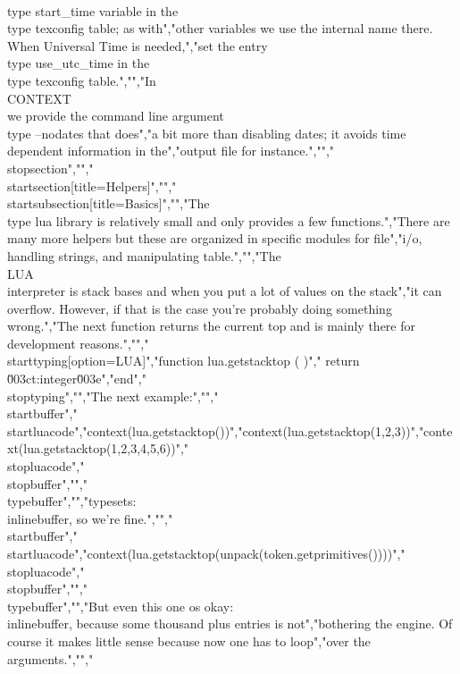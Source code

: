 \\type {start_time} variable in the \\type {texconfig} table; as with","other variables we use the internal name there. When Universal Time is needed,","set the entry \\type {use_utc_time} in the \\type {texconfig} table.","","In \\CONTEXT\\ we provide the command line argument \\type {--nodates} that does","a bit more than disabling dates; it avoids time dependent information in the","output file for instance.","","\\stopsection","","\\startsection[title={Helpers}]","","\\startsubsection[title=Basics]","","The \\type {lua} library is relatively small and only provides a few functions.","There are many more helpers but these are organized in specific modules for file","i/o, handling strings, and manipulating table.","","The \\LUA\\ interpreter is stack bases and when you put a lot of values on the stack","it can overflow. However, if that is the case you're probably doing something wrong.","The next function returns the current top and is mainly there for development reasons.","","\\starttyping[option=LUA]","function lua.getstacktop ( )","    return \u003ct:integer\u003e","end","\\stoptyping","","The next example:","","\\startbuffer","\\startluacode","context(lua.getstacktop())","context(lua.getstacktop(1,2,3))","context(lua.getstacktop(1,2,3,4,5,6))","\\stopluacode","\\stopbuffer","","\\typebuffer","","typesets: \\inlinebuffer, so we're fine.","","\\startbuffer","\\startluacode","context(lua.getstacktop(unpack(token.getprimitives())))","\\stopluacode","\\stopbuffer","","\\typebuffer","","But even this one os okay: \\inlinebuffer, because some thousand plus entries is not","bothering the engine. Of course it makes little sense because now one has to loop","over the arguments.","","%